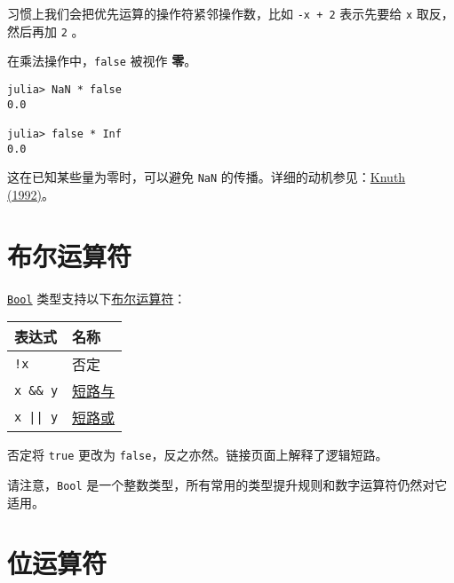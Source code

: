 习惯上我们会把优先运算的操作符紧邻操作数，比如 \texttt{-x + 2} 表示先要给 \texttt{x}  取反，然后再加 \texttt{2} 。



在乘法操作中，\texttt{false} 被视作 \textbf{零}。




\begin{verbatim}
julia> NaN * false
0.0

julia> false * Inf
0.0
\end{verbatim}



这在已知某些量为零时，可以避免 \texttt{NaN} 的传播。详细的动机参见：\href{https://arxiv.org/abs/math/9205211}{Knuth (1992)}。



\hypertarget{2190636118145801737}{}


\section{布尔运算符}



\hyperlink{46725311238864537}{\texttt{Bool}} 类型支持以下\href{https://en.wikipedia.org/wiki/Boolean\_algebra\#Operations}{布尔运算符}：




\begin{table}[h]

\begin{tabulary}{\linewidth}{|L|L|}
\hline
表达式 & 名称 \\
\hline
\texttt{!x} & 否定 \\
\hline
\texttt{x \&\& y} & \hyperlink{14451148373001501733}{短路与} \\
\hline
\texttt{x || y} & \hyperlink{14451148373001501733}{短路或} \\
\hline
\end{tabulary}

\end{table}



否定将 \texttt{true} 更改为 \texttt{false}，反之亦然。链接页面上解释了逻辑短路。



请注意，\texttt{Bool} 是一个整数类型，所有常用的类型提升规则和数字运算符仍然对它适用。



\hypertarget{17155361622718020970}{}


\section{位运算符}



